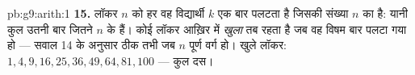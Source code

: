 \begin{solution}{pb:g9:arith:1}
\textbf{15.} लॉकर $n$ को हर वह विद्यार्थी $k$ एक बार पलटता है जिसकी
संख्या $n$ का  है: यानी कुल उतनी बार जितने $n$ के  हैं। कोई
लॉकर आख़िर में \emph{खुला} तब रहता है जब वह विषम बार पलटा गया हो ---
सवाल 14 के अनुसार ठीक तभी जब $n$ पूर्ण वर्ग हो। खुले लॉकर:
$1, 4, 9, 16, 25, 36, 49, 64, 81, 100$ --- कुल दस।

\end{solution}

